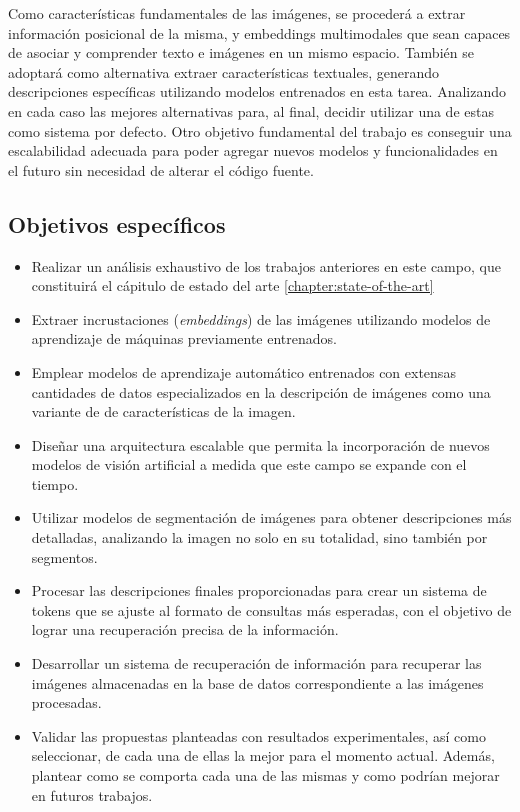 Como caracter\'isticas fundamentales de las im\'agenes, se proceder\'a a extrar informaci\'on posicional de la misma, y embeddings multimodales que sean capaces de asociar y comprender texto e im\'agenes en un mismo espacio. Tambi\'en se adoptar\'a como alternativa extraer caracter\'isticas textuales, generando descripciones espec\'ificas utilizando modelos entrenados en esta tarea. Analizando en cada caso las mejores alternativas para, al final, decidir utilizar una de estas como sistema por defecto. Otro objetivo fundamental del trabajo es conseguir una escalabilidad adecuada para poder agregar nuevos modelos y funcionalidades en el futuro sin necesidad de alterar el c\'odigo fuente. 


\subsection*{Objetivos espec\'ificos}

\begin{itemize}
\item Realizar un an\'alisis exhaustivo de los trabajos anteriores en este campo, que constituir\'a el c\'apitulo de estado del arte \ref{chapter:state-of-the-art}   
\item Extraer incrustaciones (\textit{embeddings}) de las im\'agenes utilizando modelos de aprendizaje de m\'aquinas previamente entrenados.
\item Emplear modelos de aprendizaje autom\'atico entrenados con extensas cantidades de datos especializados en la descripci\'on de im\'agenes como una variante de de caracter\'isticas de la imagen.
\item Dise\~nar una arquitectura escalable que permita la incorporaci\'on de nuevos modelos de visi\'on artificial a medida que este campo se expande con el tiempo.
\item Utilizar modelos de segmentaci\'on de im\'agenes para obtener descripciones m\'as detalladas, analizando la imagen no solo en su totalidad, sino tambi\'en por segmentos.
\item Procesar las descripciones finales proporcionadas para crear un sistema de tokens que se ajuste al formato de consultas m\'as esperadas, con el objetivo de lograr una recuperaci\'on precisa de la informaci\'on.
\item Desarrollar un sistema de recuperaci\'on de informaci\'on para recuperar las im\'agenes almacenadas en la base de datos correspondiente a las im\'agenes procesadas.
\item Validar las propuestas planteadas con resultados experimentales, as\'i como seleccionar, de cada una de ellas la mejor para el momento actual. Adem\'as, plantear como se comporta cada una de las mismas y como podr\'ian mejorar en futuros trabajos.
\end{itemize}

